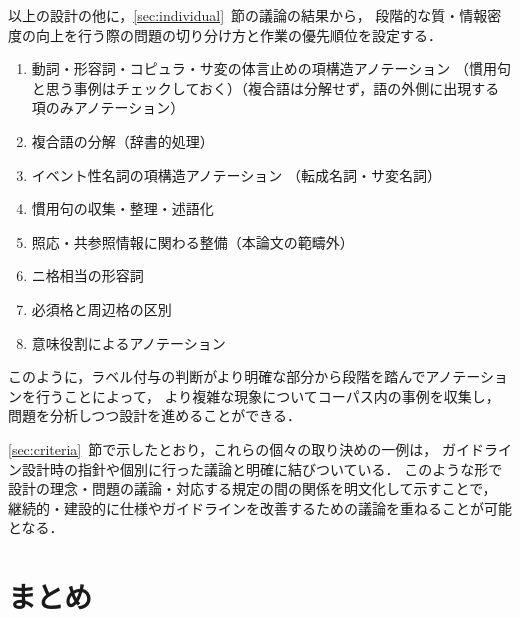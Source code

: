 \documentclass[japanese]{jnlp_1.4}
\begin{document}
以上の設計の他に，\ref{sec:individual}~節の議論の結果から，
段階的な質・情報密度の向上を行う際の問題の切り分け方と作業の優先順位を設定する．
\begin{enumerate}
\item 動詞・形容詞・コピュラ・サ変の体言止めの項構造アノテーション
（慣用句と思う事例はチェックしておく）（複合語は分解せず，語の外側に出現する項のみアノテーション）
\item 複合語の分解（辞書的処理）
\item イベント性名詞の項構造アノテーション
（転成名詞・サ変名詞）
\item 慣用句の収集・整理・述語化
\item 照応・共参照情報に関わる整備（本論文の範疇外）
\item ニ格相当の形容詞
\item 必須格と周辺格の区別
\item 意味役割によるアノテーション
\end{enumerate}
このように，ラベル付与の判断がより明確な部分から段階を踏んでアノテーションを行うことによって，
より複雑な現象についてコーパス内の事例を収集し，問題を分析しつつ設計を進めることができる．

\ref{sec:criteria}~節で示したとおり，これらの個々の取り決めの一例は，
ガイドライン設計時の指針や個別に行った議論と明確に結びついている．
このような形で設計の理念・問題の議論・対応する規定の間の関係を明文化して示すことで，
継続的・建設的に仕様やガイドラインを改善するための議論を重ねることが可能となる．


\section{まとめ}
\label{sec:conclusion}
\end{document}

